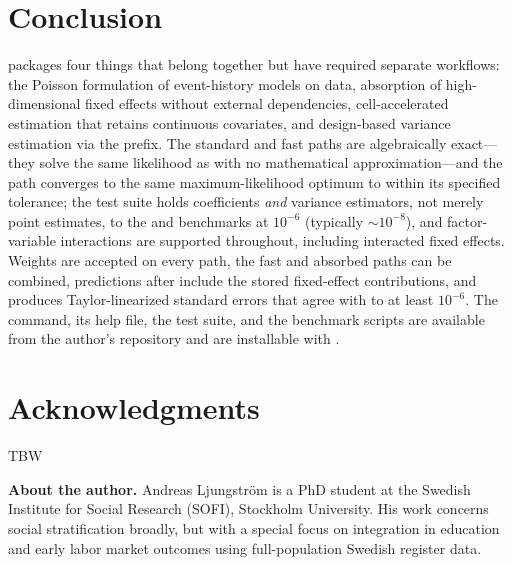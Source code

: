 \documentclass[12pt,a4paper]{article}
\begin{document}
\section{Conclusion}

 packages four things that belong together but have
required separate workflows: the Poisson formulation of event-history
models on  data, absorption of high-dimensional fixed
effects without external dependencies, cell-accelerated estimation that
retains continuous covariates, and design-based variance estimation via
the  prefix. The standard and fast paths are algebraically
exact---they solve the same likelihood as  with no
mathematical approximation---and the  path converges to
the same maximum-likelihood optimum to within its specified tolerance;
the test suite holds coefficients \emph{and} variance estimators, not
merely point estimates, to the  and 
benchmarks at \(10^{-6}\) (typically \(\sim 10^{-8}\)), and
factor-variable interactions are supported throughout, including
interacted fixed effects. Weights are accepted on every path, the fast
and absorbed paths can be combined, predictions after 
include the stored fixed-effect contributions, and 
produces Taylor-linearized standard errors that agree with
 to at least \(10^{-6}\). The command, its help
file, the test suite, and the benchmark scripts are available from the
author's repository and are installable with .

\section{Acknowledgments}

TBW




\bigskip\noindent\textbf{About the author.} Andreas Ljungström is a PhD
student at the Swedish Institute for Social Research (SOFI), Stockholm
University. His work concerns social stratification broadly, but with a
special focus on integration in education and early labor market
outcomes using full-population Swedish register data.
\end{document}
